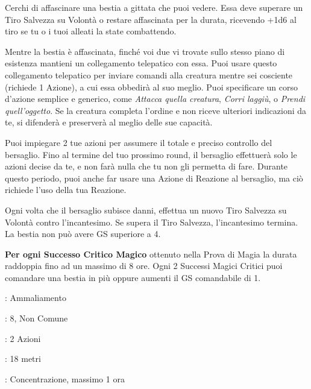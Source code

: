 \begin{multicols}{2}
Cerchi di affascinare una bestia a gittata che puoi vedere. Essa deve superare un Tiro Salvezza su Volontà o restare affascinata per la durata, ricevendo +1d6 al tiro se tu o i tuoi alleati la state combattendo.

Mentre la bestia è affascinata, finché voi due vi trovate sullo stesso piano di esistenza mantieni un collegamento telepatico con essa. Puoi usare questo collegamento telepatico per inviare comandi alla creatura mentre sei cosciente (richiede 1 Azione), a cui essa obbedirà al suo meglio. Puoi specificare un corso d'azione semplice e generico, come \emph{Attacca quella creatura}, \emph{Corri laggiù}, o \emph{Prendi quell'oggetto}. Se la creatura completa l'ordine e non riceve ulteriori indicazioni da te, si difenderà e preserverà al meglio delle sue capacità.

Puoi impiegare 2 tue azioni per assumere il totale e preciso controllo del bersaglio. Fino al termine del tuo prossimo round, il bersaglio effettuerà solo le azioni decise da te, e non farà nulla che tu non gli permetta di fare. Durante questo periodo, puoi anche far usare una Azione di Reazione al bersaglio, ma ciò richiede l'uso della tua Reazione.

Ogni volta che il bersaglio subisce danni, effettua un nuovo Tiro Salvezza su Volontà contro l'incantesimo. Se supera il Tiro Salvezza, l'incantesimo termina. La bestia non può avere GS superiore a 4.

\textbf{Per ogni Successo Critico Magico} ottenuto nella Prova di Magia la durata raddoppia fino ad un massimo di 8 ore. Ogni 2 Successi Magici Critici puoi comandare una bestia in più oppure aumenti il GS comandabile di 1.

\noindent\colorbox{OBSSgold!10}{
\begin{minipage}{0.95\linewidth}
\begin{description}[noitemsep, topsep=0pt, parsep=0pt, partopsep=0pt, leftmargin=0cm, labelwidth=1.3cm]
	\item[\textbf{Lista}]: Ammaliamento
	\item[\textbf{Livello}]: 8, Non Comune
	\item[\textbf{Lancio}]: 2 Azioni
	\item[\textbf{Gittata}]: 18 metri
	\item[\textbf{Durata}]: Concentrazione, massimo 1 ora
\end{description}
\end{minipage}}\smallskip


\end{multicols}
